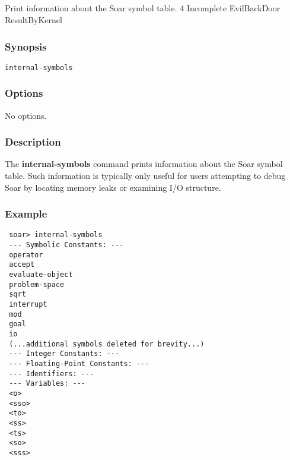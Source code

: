 \subsection{}
\label{internal-symbols}
Print information about the Soar symbol table. 
 4 Incomplete EvilBackDoor ResultByKernel
\subsubsection*{Synopsis}
\begin{verbatim}
internal-symbols
\end{verbatim}
\subsubsection*{Options}
 No options. 
\subsubsection*{Description}
 The \textbf{internal-symbols}
 command prints information about the Soar symbol table. Such information is typically only useful for users attempting to debug Soar by locating memory leaks or examining I/O structure. 
\subsubsection*{Example}
\begin{verbatim}
 soar> internal-symbols
 --- Symbolic Constants: ---
 operator
 accept
 evaluate-object
 problem-space
 sqrt
 interrupt
 mod
 goal
 io
 (...additional symbols deleted for brevity...)
 --- Integer Constants: ---
 --- Floating-Point Constants: ---
 --- Identifiers: ---
 --- Variables: ---  
 <o>
 <sso>
 <to>
 <ss>
 <ts>
 <so>
 <sss>
\end{verbatim}
